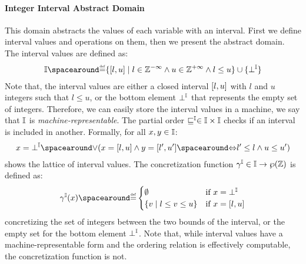 \paragraph{Integer Interval Abstract Domain}
This domain abstracts the values of each variable with an interval.
First we define interval values and operations on them, then we present the abstract domain. The interval values are defined as:
  \begin{align*}
    \intervaltype \DefeQ \setdef{\interval{l}{u}}{l \in \Zminus \land u \in \Zplus \land l \le u} \setjoin \{\intervalbottom\}
  \end{align*}
Note that, the interval values are either a closed interval $[l, u]$ with $l$ and $u$ integers such that $l \le u$, or the bottom element $\bot^{\mathbb{I}}$ that represents the empty set of integers. Therefore, we can easily store the interval values in a machine, we say that $\mathbb{I}$ is \emph{machine-representable}.
The partial order $\sqsubseteq^{\mathbb{I}}\in\mathbb{I}\times\mathbb{I}$ checks if an interval is included in another. Formally, for all $x, y \in \mathbb{I}$:
  \begin{align*}
    x = \intervalbottom \LoR (x = \interval{l}{u} \land y = \interval{l'}{u'} \IfF l' \le l \land u \le u')
  \end{align*}
   shows the lattice of interval values.
  The concretization function $\gamma^{\mathbb{I}}\in\mathbb{I}\to\wp(\mathbb{Z})$ is defined as:
  \begin{align*}
    \intervalconcretization(x) \DefeQ \begin{cases}
      \emptyset & \text{if } x = \intervalbottom \\
      \setdef{v}{l \le v \le u} & \text{if } x = \interval{l}{u}
    \end{cases}
  \end{align*}
  concretizing the set of integers between the two bounds of the interval, or the empty set for the bottom element $\bot^{\mathbb{I}}$.
  Note that, while interval values have a machine-representable form and the ordering relation is effectively computable, the concretization function is not.
%
